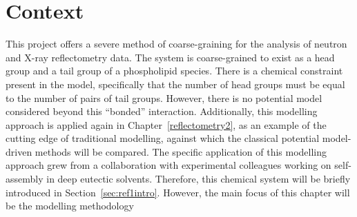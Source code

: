 \section*{Context}
This project offers a severe method of coarse-graining for the analysis of neutron and X-ray reflectometry data.
The system is coarse-grained to exist as a head group and a tail group of a phospholipid species.
There is a chemical constraint present in the model, specifically that the number of head groups must be equal to the number of pairs of tail groups.
However, there is no potential model considered beyond this ``bonded'' interaction.
Additionally, this modelling approach is applied again in Chapter~\ref{reflectometry2}, as an example of the cutting edge of traditional modelling, against which the classical potential model-driven methods will be compared.
The specific application of this modelling approach grew from a collaboration with experimental colleagues working on self-assembly in deep eutectic solvents.
Therefore, this chemical system will be briefly introduced in Section~\ref{sec:ref1intro}.
However, the main focus of this chapter will be the modelling methodology
